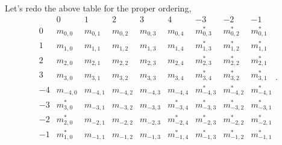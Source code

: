 \documentclass[11pt]{amsart}
\begin{document}
Let's redo the above table for the proper ordering,
\begin{equation}
\begin{array}{c|ccccc|ccc} & 0 & 1 & 2 & 3 & 4 & -3 & -2 & -1 \\ \hline
0 & m_{0,0} & m_{0,1} & m_{0,2} & m_{0,3} & m_{0,4} & m_{0,3}^\ast & m_{0,2}^\ast & m_{0,1}^\ast \\
1 & m_{1,0} & m_{1,1} & m_{1,2} & m_{1,3} & m_{1,4} & m_{1,3}^\ast & m_{1,2}^\ast & m_{1,1}^\ast \\
2 & m_{2,0} & m_{2,1} & m_{2,2} & m_{2,3} & m_{2,4} & m_{2,3}^\ast & m_{2,2}^\ast & m_{2,1}^\ast \\
3 & m_{3,0} & m_{3,1} & m_{3,2} & m_{3,3} & m_{3,4} & m_{3,4}^\ast & m_{3,2}^\ast & m_{3,1}^\ast \\
-4 & m_{-4,0} & m_{-4,1} & m_{-4,2} & m_{-4,3} & m_{-4,4} & m_{-4,3}^\ast & m_{-4,2}^\ast & m_{-4,1}^\ast \\
-3 & m_{3,0}^\ast & m_{-3,1} & m_{-3,2} & m_{-3,3} & m_{-3,4}^\ast & m_{-3,3}^\ast & m_{-3,2}^\ast & m_{-3,1}^\ast \\
-2 & m_{2,0}^\ast & m_{-2,1} & m_{-2,2} & m_{-2,3} & m_{-2,4}^\ast & m_{-2,3}^\ast & m_{-2,2}^\ast & m_{-2,1}^\ast \\
-1 & m_{1,0}^\ast & m_{-1,1} & m_{-1,2} & m_{-1,3} & m_{-1,4}^\ast & m_{-1,3}^\ast & m_{-1,2}^\ast & m_{-1,1}^\ast\end{array}.
\end{equation}
\end{document}
